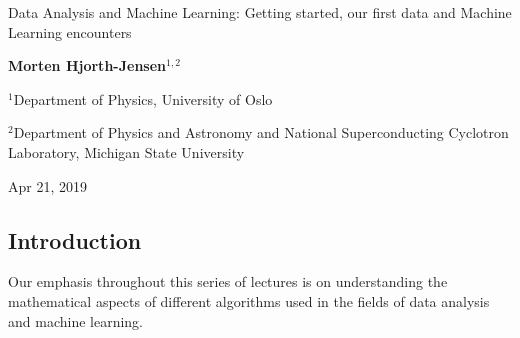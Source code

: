 \documentclass[%
oneside,                 %
final,                   %
10pt]{article}
\begin{document}

\newcommand{\exercisesection}[1]{\subsection*{#1}}






\thispagestyle{empty}

\begin{center}
{\LARGE\bf
\begin{spacing}{1.25}
Data Analysis and Machine Learning: Getting started, our first data and Machine Learning encounters
\end{spacing}
}
\end{center}


\begin{center}
{\bf Morten Hjorth-Jensen${}^{1, 2}$} \\ [0mm]
\end{center}

\begin{center}
\centerline{{\small ${}^1$Department of Physics, University of Oslo}}
\centerline{{\small ${}^2$Department of Physics and Astronomy and National Superconducting Cyclotron Laboratory, Michigan State University}}
\end{center}
    

\begin{center}
Apr 21, 2019
\end{center}

\vspace{1cm}


\subsection{Introduction}

Our emphasis throughout this series of lectures  
is on understanding the mathematical aspects of
different algorithms used in the fields of data analysis and machine learning. 
\end{document}
